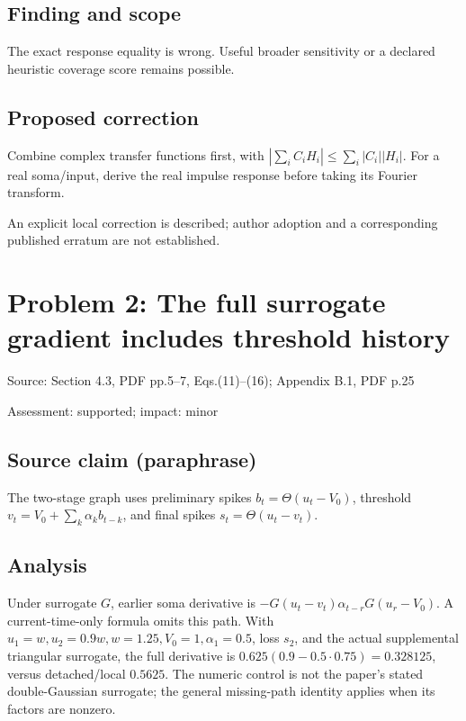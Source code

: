 \documentclass[11pt]{article}
\begin{document}
\subsection*{Finding and scope}

The exact response equality is wrong. Useful broader sensitivity or a declared heuristic coverage score remains possible.

\subsection*{Proposed correction}

Combine complex transfer functions first, with \(|\sum_iC_iH_i|\leq\sum_i|C_i||H_i|\). For a real soma/input, derive the real impulse response before taking its Fourier transform.

An explicit local correction is described; author adoption and a corresponding published erratum are not established.

\section*{Problem 2: The full surrogate gradient includes threshold history}

Source: Section 4.3, PDF pp.5–7, Eqs.(11)–(16); Appendix B.1, PDF p.25

Assessment: supported; impact: minor

\subsection*{Source claim (paraphrase)}

The two-stage graph uses preliminary spikes \(b_t=\Theta(u_t-V_0)\), threshold \(v_t=V_0+\sum_k\alpha_kb_{t-k}\), and final spikes \(s_t=\Theta(u_t-v_t)\).

\subsection*{Analysis}

Under surrogate \(G\), earlier soma derivative is \(-G(u_t-v_t)\alpha_{t-r}G(u_r-V_0)\). A current-time-only formula omits this path. With \(u_1=w,u_2=0.9w,w=1.25,V_0=1,\alpha_1=0.5\), loss \(s_2\), and the actual supplemental triangular surrogate, the full derivative is \(0.625(0.9-0.5\cdot0.75)=0.328125\), versus detached/local \(0.5625\). The numeric control is not the paper’s stated double-Gaussian surrogate; the general missing-path identity applies when its factors are nonzero.
\end{document}
